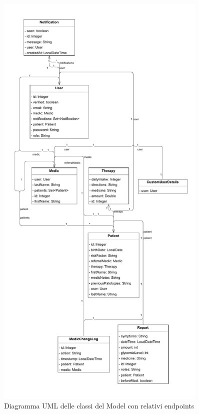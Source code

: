 \documentclass[a4paper]{article}
\begin{document}
\begin{figure}[H]
  \begin{center}
    \includegraphics[width=0.9\textwidth]{umlModel.pdf}
  \end{center}
  \caption{Diagramma UML delle classi del Model con relativi endpoints} 
\end{figure}
\end{document}
